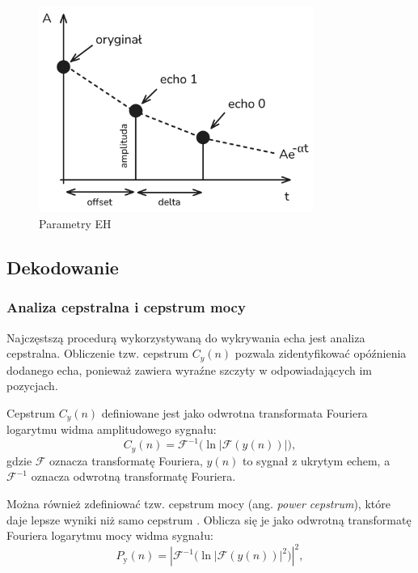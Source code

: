 \begin{figure}[ht!]
	\centering
	\includegraphics[width=0.8\textwidth]{img/echo-hiding.png}
	\caption{\label{fig:echo-hiding} Parametry EH}
\end{figure}
\pagebreak


\subsection{Dekodowanie}

\subsubsection{Analiza cepstralna i cepstrum mocy}

Najczęstszą procedurą wykorzystywaną do wykrywania echa jest analiza cepstralna.
Obliczenie tzw. cepstrum $C_y(n)$ pozwala zidentyfikować opóźnienia dodanego echa, ponieważ zawiera wyraźne szczyty w odpowiadających im pozycjach.

Cepstrum $C_y(n)$ definiowane jest jako odwrotna transformata Fouriera logarytmu widma amplitudowego sygnału:
\begin{equation}
	C_y(n) = \mathcal{F}^{-1} \big(\ln |\mathcal{F}(y(n))|\big),
\end{equation}
gdzie $\mathcal{F}$ oznacza transformatę Fouriera, $y(n)$ to sygnał z ukrytym echem, a $\mathcal{F}^{-1}$ oznacza odwrotną transformatę Fouriera.

Można również zdefiniować tzw. cepstrum mocy (ang. \textit{power cepstrum}), które daje lepsze wyniki niż samo cepstrum \cite{auto_power_cepstrum}. Oblicza się je jako odwrotną transformatę Fouriera logarytmu mocy widma sygnału:
\begin{equation}
	P_{\text{y}}(n) = \left| \mathcal{F}^{-1} \big( \ln |\mathcal{F}(y(n))|^2 \big) \right|^2,
\end{equation}

